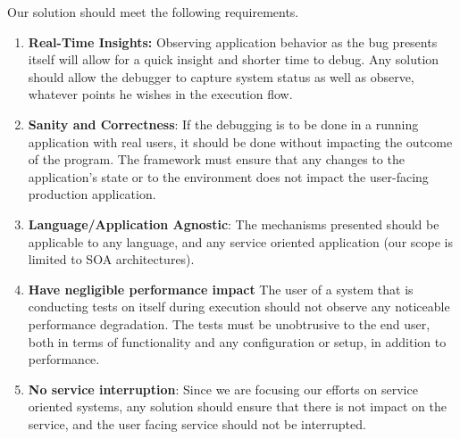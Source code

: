 Our solution should meet the following requirements.

\begin{enumerate}
	\setlength{\itemsep}{0pt}
	\item \textbf{Real-Time Insights: }
	Observing application behavior as the bug presents itself will allow for a quick insight and shorter time to debug.
	Any solution should allow the debugger to capture system status as well as observe, whatever points he wishes in the execution flow.
	
	
	\item \textbf{Sanity and Correctness}:
	If the debugging is to be done in a running application with real users, it should be done without impacting the outcome of the program.
	The framework must ensure that any changes to the application's state or to the environment does not impact the user-facing production application.
	
	\item \textbf{Language/Application Agnostic}:
	The mechanisms presented should be applicable to any language, and any service oriented application (our scope is limited to SOA architectures).
	
	
	\item \textbf{Have negligible performance impact}
	The user of a system that is conducting tests on itself during execution should not observe any noticeable performance degradation. The tests must be unobtrusive to the end user, both in terms of functionality and any configuration or setup, in addition to performance.
	
	\item \textbf{No service interruption}: Since we are focusing our efforts on service oriented systems, any solution should ensure that there is not impact on the service, and the user facing service should not be interrupted.
	
\end{enumerate}


